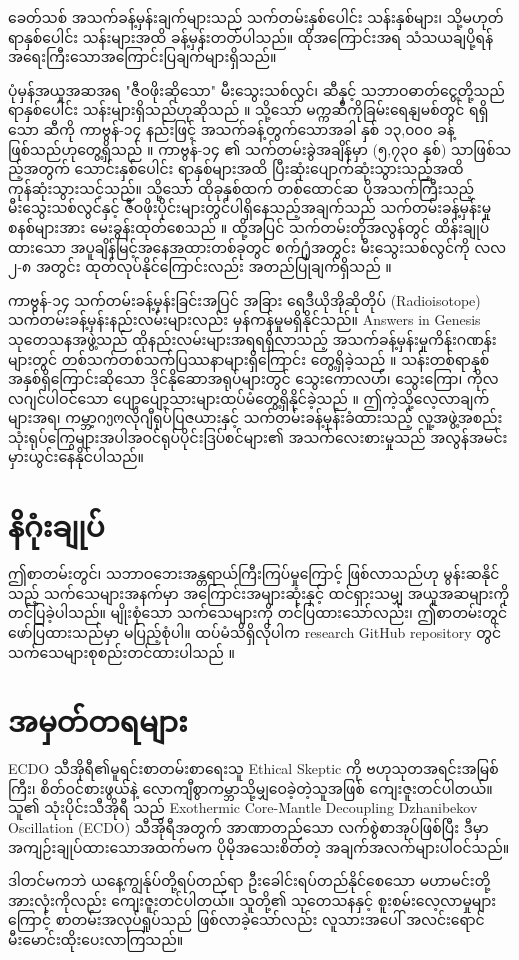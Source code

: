 \documentclass[10pt,twocolumn,letterpaper]{article}
\begin{document}
ခေတ်သစ် အသက်ခန့်မှန်းချက်များသည် သက်တမ်းနှစ်ပေါင်း သန်းနှစ်များ၊ သို့မဟုတ် ရာနှစ်ပေါင်း သန်းများအထိ ခန့်မှန်းတတ်ပါသည်။ ထိုအကြောင်းအရ သံသယချပို့ရန် အရေးကြီးသောအကြောင်းပြချက်များရှိသည်။

ပုံမှန်အယူအဆအရ "ဇီဝဖိုးဆိုသော" မီးသွေးသစ်လွင်၊ ဆီနှင့် သဘာဝဓာတ်ငွေ့တို့သည် ရာနှစ်ပေါင်း သန်းများရှိသည်ဟုဆိုသည် \cite{104}။ သို့သော် မက္ကဆီကိုခြမ်းရေနျမစ်တွင် ရရှိသော ဆီကို ကာဗွန်-၁၄ နည်းဖြင့် အသက်ခန့်တွက်သောအခါ နှစ် ၁၃,၀၀၀ ခန့် ဖြစ်သည်ဟုတွေ့ရှိသည် \cite{105}။ ကာဗွန်-၁၄ ၏ သက်တမ်းခွဲအချိန်မှာ (၅,၇၃၀ နှစ်) သာဖြစ်သည့်အတွက် သောင်းနှစ်ပေါင်း ရာနှစ်များအထိ ပြီးဆုံးပျောက်ဆုံးသွားသည့်အထိ ကုန်ဆုံးသွားသင့်သည်။ သို့သော် ထိုခုနှစ်ထက် တစ်ထောင်ဆ ပိုအသက်ကြီးသည့် မီးသွေးသစ်လွင်နှင့် ဇီဝဖိုးပိုင်းများတွင်ပါရှိနေသည့်အချက်သည် သက်တမ်းခန့်မှန်းမှုစနစ်များအား မေးခွန်းထုတ်စေသည် \cite{106}။ ထို့အပြင် သက်တမ်းတိုအလွန်တွင် ထိန်းချုပ်ထားသော အပူချိန်မြင့်အနေအထားတစ်ခုတွင် စက်႐ုံအတွင်း မီးသွေးသစ်လွင်ကို လလ ၂-၈ အတွင်း ထုတ်လုပ်နိုင်ကြောင်းလည်း အတည်ပြုချက်ရှိသည် \cite{107}။

ကာဗွန်-၁၄ သက်တမ်းခန့်မှန်းခြင်းအပြင် အခြား ရေဒီယိုအိုဆိုတိုပ် (Radioisotope) သက်တမ်းခန့်မှန်းနည်းလမ်းများလည်း မှန်ကန်မှုမရှိနိုင်သည်။ Answers in Genesis သုတေသနအဖွဲ့သည် ထိုနည်းလမ်းများအရရရှိလာသည့် အသက်ခန့်မှန်းမှုကိန်းဂဏန်းများတွင် တစ်သက်တစ်သက်ပြဿနာများရှိကြောင်း တွေ့ရှိခဲ့သည် \cite{108}။ သန်းတစ်ရာနှစ်အနှစ်ရှိကြောင်းဆိုသော ဒိုင်နိုဆောအရုပ်များတွင် သွေးကောလဟ်၊ သွေးကြော၊ ကိုလလဂျင်ပါဝင်သော ပျော့ပျော့သားများထပ်မံတွေ့ရှိနိုင်ခဲ့သည် \cite{109,110}။ ဤကဲ့သို့လေ့လာချက်များအရ၊ ကမ္ဘာ့ဂეოလိုဂျီရုပ်ပြဇယားနှင့် သက်တမ်းခန့်မှန်းခံထားသည့် လူ့အဖွဲ့အစည်းသုံးရုပ်ကြွေများအပါအဝင်ရုပ်ပိုင်းဒြပ်စင်များ၏ အသက်လေးစားမှုသည် အလွန်အမင်း မှားယွင်းနေနိုင်ပါသည်။

\section{နိဂုံးချုပ်}

ဤစာတမ်းတွင်၊ သဘာဝဘေးအန္တရာယ်ကြီးကြပ်မှုကြောင့် ဖြစ်လာသည်ဟု မွန်းဆနိုင်သည့် သက်သေများအနက်မှာ အကြောင်းအများဆုံးနှင့် ထင်ရှားသမျှ အယူအဆများကို တင်ပြခဲ့ပါသည်။ မျိုးစုံသော သက်သေများကို တင်ပြထားသော်လည်း၊ ဤစာတမ်းတွင် ဖော်ပြထားသည်မှာ မပြည့်စုံပါ။ ထပ်မံသိရှိလိုပါက research GitHub repository တွင် သက်သေများစုစည်းတင်ထားပါသည် \cite{2}။
\section{အမှတ်တရများ}

ECDO သီအိုရီ၏မူရင်းစာတမ်းစာရေးသူ Ethical Skeptic ကို ဗဟုသုတအရင်းအမြစ်ကြီး၊ စိတ်ဝင်စားဖွယ်နဲ့ လောကျီစွာကမ္ဘာသို့မျှဝေခဲ့တဲ့သူအဖြစ် ကျေးဇူးတင်ပါတယ်။ သူ၏ သုံးပိုင်းသီအိုရီ \cite{1} သည် Exothermic Core-Mantle Decoupling Dzhanibekov Oscillation (ECDO) သီအိုရီအတွက် အာဏာတည်သော လက်စွဲစာအုပ်ဖြစ်ပြီး ဒီမှာအကျဉ်းချုပ်ထားသောအထက်မက ပိုမိုအသေးစိတ်တဲ့ အချက်အလက်များပါဝင်သည်။

ဒါတင်မကဘဲ ယနေ့ကျွန်ုပ်တို့ရပ်တည်ရာ ဦးခေါင်းရပ်တည်နိုင်စေသော မဟာမင်းတို့အားလုံးကိုလည်း ကျေးဇူးတင်ပါတယ်။ သူတို့၏ သုတေသနနှင့် စူးစမ်းလေ့လာမှုများကြောင့် စာတမ်းအလုပ်ရှုပ်သည် ဖြစ်လာခဲ့သော်လည်း လူသားအပေါ် အလင်းရောင် မီးမောင်းထိုးပေးလာကြသည်။

\clearpage
\twocolumn

{\small
\renewcommand{\refname}{ရင်းမြစ်များ}


}
\end{document}
